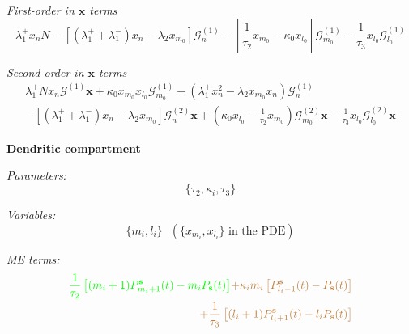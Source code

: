 \documentclass[a4paper, 11pt]{article}
\begin{document}
              {\it First-order in $\mathbf x$ terms}
              \begin{equation}
                \lambda_1^+x_nN-\left[(\lambda_1^++\lambda_1^-)x_n - \lambda_2x_{m_0}\right]\mathcal G^{(1)}_n - \left[\frac{1}{\tau_2}x_{m_0}-\kappa_0x_{l_0}\right]\mathcal G^{(1)}_{m_0} - \frac{1}{\tau_3}x_{l_0}\mathcal G^{(1)}_{l_0}
              \end{equation}
              
              {\it Second-order in $\mathbf x$ terms}
              \begin{multline*}
                \lambda_1^+Nx_n\boldsymbol{\mathcal G}^{(1)}\mathbf x + \kappa_0x_{m_0}x_{l_0}\mathcal G^{(1)}_{m_0} - \left(\lambda_1^+x_n^2-\lambda_2x_{m_0}x_n\right)\mathcal G_n^{(1)}\\
                -\left[\left(\lambda_1^++\lambda_1^-\right)x_n-\lambda_2x_{m_0}\right]\boldsymbol{\mathcal G}_n^{(2)}\mathbf x + \left(\kappa_0x_{l_0}-\frac{1}{\tau_2}x_{m_0}\right)\boldsymbol{\mathcal G}_{m_0}^{(2)}\mathbf x - \frac{1}{\tau_3}x_{l_0}\boldsymbol{\mathcal G}^{(2)}_{l_0}\mathbf x
              \end{multline*}

              {\bf Dendritic compartment}
              
              {\it Parameters:}
              \begin{equation*}
                \{\tau_2, \kappa_i, \tau_3\}
              \end{equation*}

              {\it Variables:}
              \begin{equation*}
                \{m_i, l_i\}\ \ \ \left(\{x_{m_i}, x_{l_i}\}\text{ in the PDE}\right)
              \end{equation*}

              
              {\it ME terms:}
              \begin{equation}
                \begin{split}
                  \textcolor{green}{\frac{1}{\tau_2}\left[(m_i+1)P_{m_i+1}^{\mathbf s}(t) - m_iP_{\mathbf s}(t)\right]} \textcolor{brown}{+ \kappa_im_i\left[P_{l_i-1}^{\mathbf s}(t) - P_{\mathbf s}(t)\right]}\\
                  \textcolor{brown}{+ \frac{1}{\tau_3}\left[(l_i+1)P_{l_i+1}^{\mathbf s}(t) - l_iP_{\mathbf s}(t)\right]}
                \end{split}
              \end{equation}
              
\end{document}
